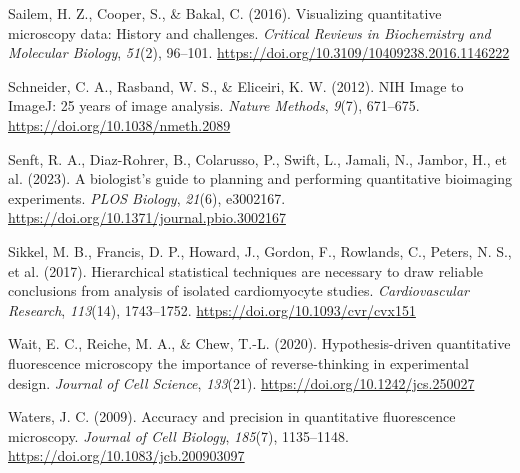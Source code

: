 \documentclass[
]{agujournal2019}
\newlength{\cslhangindent}
\newlength{\cslentryspacingunit} %
\newenvironment{CSLReferences}[2] %
 {%
  \setlength{\parindent}{0pt}
  \ifodd #1
  \let\oldpar\par
  \def\par{\hangindent=\cslhangindent\oldpar}
  \fi
  \setlength{\parskip}{#2\cslentryspacingunit}
 }%
 {}
\begin{document}
\begin{CSLReferences}{1}{0}
\leavevmode{}%
Sailem, H. Z., Cooper, S., \& Bakal, C. (2016). Visualizing quantitative
microscopy data: History and challenges. \emph{Critical Reviews in
Biochemistry and Molecular Biology}, \emph{51}(2), 96--101.
\url{https://doi.org/10.3109/10409238.2016.1146222}

\leavevmode{}%
Schneider, C. A., Rasband, W. S., \& Eliceiri, K. W. (2012). NIH Image
to ImageJ: 25 years of image analysis. \emph{Nature Methods},
\emph{9}(7), 671--675. \url{https://doi.org/10.1038/nmeth.2089}

\leavevmode{}%
Senft, R. A., Diaz-Rohrer, B., Colarusso, P., Swift, L., Jamali, N.,
Jambor, H., et al. (2023). A biologist{'}s guide to planning and
performing quantitative bioimaging experiments. \emph{PLOS Biology},
\emph{21}(6), e3002167.
\url{https://doi.org/10.1371/journal.pbio.3002167}

\leavevmode{}%
Sikkel, M. B., Francis, D. P., Howard, J., Gordon, F., Rowlands, C.,
Peters, N. S., et al. (2017). Hierarchical statistical techniques are
necessary to draw reliable conclusions from analysis of isolated
cardiomyocyte studies. \emph{Cardiovascular Research}, \emph{113}(14),
1743--1752. \url{https://doi.org/10.1093/cvr/cvx151}

\leavevmode{}%
Wait, E. C., Reiche, M. A., \& Chew, T.-L. (2020). Hypothesis-driven
quantitative fluorescence microscopy {\textendash} the importance of
reverse-thinking in experimental design. \emph{Journal of Cell Science},
\emph{133}(21). \url{https://doi.org/10.1242/jcs.250027}

\leavevmode{}%
Waters, J. C. (2009). Accuracy and precision in quantitative
fluorescence microscopy. \emph{Journal of Cell Biology}, \emph{185}(7),
1135--1148. \url{https://doi.org/10.1083/jcb.200903097}

\end{CSLReferences}
\end{document}
